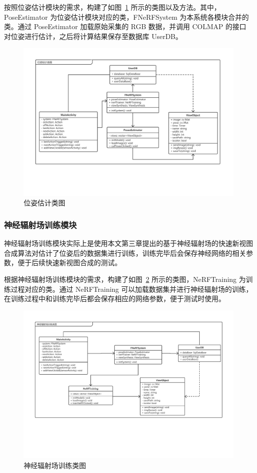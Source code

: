 按照位姿估计模块的需求，构建了如图~\ref{fig:poseEstimationCD} 所示的类图以及方法。其中，PoseEstimator 为位姿估计模块对应的类，FNeRFSystem 为本系统各模块合并的类。通过 PoseEstimator 加载原始采集的 RGB 数据，并调用 COLMAP 的接口对位姿进行估计，之后将计算结果保存至数据库 UserDB。
\begin{figure}[htbp]
	\centering
	\includegraphics[width=0.95\linewidth]{figures/poseEstimationCD.pdf}
	\caption{位姿估计类图}
	\label{fig:poseEstimationCD}
\end{figure}

\subsubsection{神经辐射场训练模块}
神经辐射场训练模块实际上是使用本文第三章提出的基于神经辐射场的快速新视图合成算法对估计了位姿后的数据集进行训练，训练完毕后会保存神经网络的相关参数，便于后续快速新视图合成的测试。

根据神经辐射场训练模块的需求，构建了如图~\ref{fig:NeRFTrainCD} 所示的类图，NeRFTraining 为训练过程对应的类。通过 NeRFTraining 可以加载数据集并进行神经辐射场的训练，在训练过程中和训练完毕后都会保存相应的网络参数，便于测试时使用。
\begin{figure}[htbp]
	\centering
	\includegraphics[width=0.95\linewidth]{figures/NeRFTrainCD.pdf}
	\caption{神经辐射场训练类图}
	\label{fig:NeRFTrainCD}
\end{figure}
